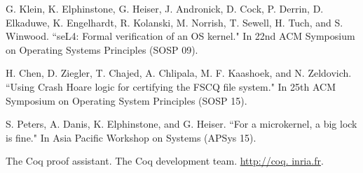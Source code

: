 \documentclass[a4paper, 10pt]{article}
\begin{document}
\begin{footnotesize}
\begin{thebibliography}{}
G. Klein, K. Elphinstone, G. Heiser, J. Andronick,
D. Cock, P. Derrin, D. Elkaduwe, K. Engelhardt,
R. Kolanski, M. Norrish, T. Sewell, H. Tuch, and
S. Winwood. ``seL4: Formal verification of an OS
kernel." In 22nd ACM Symposium on Operating
Systems Principles (SOSP 09).

H. Chen, D. Ziegler, T. Chajed, A. Chlipala, M. F.
Kaashoek, and N. Zeldovich. ``Using Crash Hoare
logic for certifying the FSCQ file system." In
25th ACM Symposium on Operating System Principles
(SOSP 15).

S. Peters, A. Danis, K. Elphinstone, and G. Heiser.
``For a microkernel, a big lock is fine." In 
Asia Pacific Workshop on Systems (APSys 15).

The Coq proof assistant. The Coq development team.  \url{http://coq.
inria.fr}.



\end{thebibliography}
\end{footnotesize}
\end{document}
